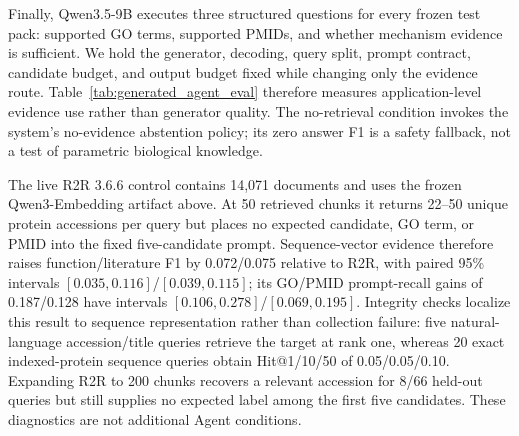 \documentclass[11pt]{article}
\begin{document}
Finally, Qwen3.5-9B executes three structured questions for every frozen test pack: supported GO terms, supported PMIDs, and whether mechanism evidence is sufficient. We hold the generator, decoding, query split, prompt contract, candidate budget, and output budget fixed while changing only the evidence route. Table~\ref{tab:generated_agent_eval} therefore measures application-level evidence use rather than generator quality. The no-retrieval condition invokes the system's no-evidence abstention policy; its zero answer F1 is a safety fallback, not a test of parametric biological knowledge.

\begin{table}[t]
\centering
\caption{Fixed-Qwen3.5 Agent route ablation on 66 held-out queries. The R2R row is a live generic semantic text-RAG control over the same held-out index. Prompt recall measures whether expected labels reach the executable prompt; entailment checks every emitted citation against the supplied evidence.}
\label{tab:generated_agent_eval}
\end{table}

The live R2R 3.6.6 control contains 14,071 documents and uses the frozen Qwen3-Embedding artifact above. At 50 retrieved chunks it returns 22--50 unique protein accessions per query but places no expected candidate, GO term, or PMID into the fixed five-candidate prompt. Sequence-vector evidence therefore raises function/literature F1 by 0.072/0.075 relative to R2R, with paired 95\% intervals $[0.035,0.116]$/$[0.039,0.115]$; its GO/PMID prompt-recall gains of 0.187/0.128 have intervals $[0.106,0.278]$/$[0.069,0.195]$. Integrity checks localize this result to sequence representation rather than collection failure: five natural-language accession/title queries retrieve the target at rank one, whereas 20 exact indexed-protein sequence queries obtain Hit@1/10/50 of 0.05/0.05/0.10. Expanding R2R to 200 chunks recovers a relevant accession for 8/66 held-out queries but still supplies no expected label among the first five candidates. These diagnostics are not additional Agent conditions.
\end{document}
